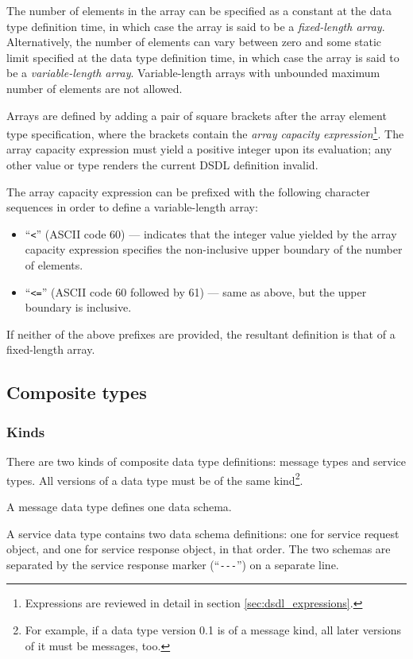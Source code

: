 The number of elements in the array can be specified as a constant at the data type definition time,
in which case the array is said to be a \emph{fixed-length array}.
Alternatively, the number of elements can vary between zero and some static limit specified
at the data type definition time,
in which case the array is said to be a \emph{variable-length array}.
Variable-length arrays with unbounded maximum number of elements are not allowed.

Arrays are defined by adding a pair of square brackets after the array element type specification,
where the brackets contain the \emph{array capacity expression}\footnote{%
Expressions are reviewed in detail in section \ref{sec:dsdl_expressions}.}.
The array capacity expression must yield a positive integer upon its evaluation;
any other value or type renders the current DSDL definition invalid.

The array capacity expression can be prefixed with the following character sequences in order to define
a variable-length array:
\begin{itemize}
    \item ``\verb|<|'' (ASCII code 60) --- indicates that the integer value yielded by the array capacity expression
    specifies the non-inclusive upper boundary of the number of elements.

    \item ``\verb|<=|'' (ASCII code 60 followed by 61) --- same as above, but the upper boundary is inclusive.
\end{itemize}
If neither of the above prefixes are provided, the resultant definition is that of a fixed-length array.

\subsection{Composite types}

\subsubsection{Kinds}

There are two kinds of composite data type definitions: message types and service types.
All versions of a data type must be of the same kind\footnote{%
For example, if a data type version 0.1 is of a message kind, all later versions of it must be messages, too.}.

A message data type defines one data schema.

A service data type contains two data schema definitions:
one for service request object, and one for service response object, in that order.
The two schemas are separated by the service response marker (``\verb|---|'') on a separate line.


